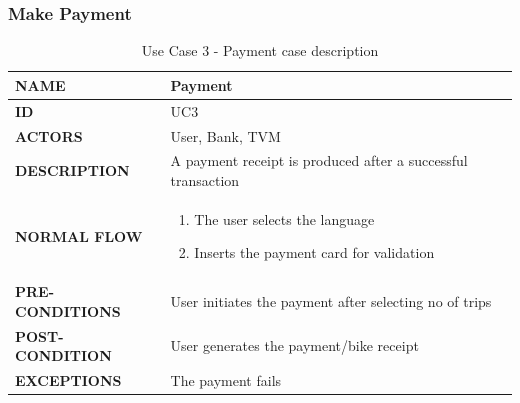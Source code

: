 \subsubsection{Make Payment}
\begin{table}[H]
\begin{center}
\renewcommand{\arraystretch}{2}
\begin{tabular}{|p{8cm}|p{8cm}| } 
 \hline
 \textbf{NAME} & Payment\\ 
 \hline
 \textbf{ID} & UC3  \\ 
 \hline
 \textbf{ACTORS} & User, Bank, TVM\\
 \hline
 \textbf{DESCRIPTION} & A payment receipt is produced after a successful transaction \\  
 \hline
 \textbf{NORMAL FLOW} & \begin{enumerate}
     \item The user selects the language
     \item Inserts the payment card for validation
 \end{enumerate} \\
 \hline
 \textbf{PRE-CONDITIONS} & User initiates the payment after selecting no of trips\\
 \hline
 \textbf{POST-CONDITION} & User generates the payment/bike receipt\\
 \hline
 \textbf{EXCEPTIONS} & The payment fails\\
 \hline
\end{tabular}
\caption{\label{demo-table}Use Case 3 - Payment case description}
\end{center}
\end{table}

